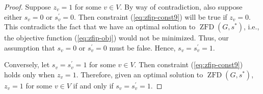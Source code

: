 \documentclass{article}
\newcommand\dzf[1]{\operatorname{ZFD}\left(#1\right)}
\theoremstyle{definition}
\begin{document}
\begin{proof}
Suppose $z_v = 1$ for some $v \in V$.
By way of contradiction, also suppose either $s_v = 0$ or $s_v^{'} = 0$.
Then constraint  (\ref{eq:zfip-const9}) will be true if $z_v = 0$.
This contradicts the fact that we have an optimal solution to $\dzf{G,s^{*}}$, i.e., the objective function (\ref{eq:zfip-obj}) would not be minimized.
Thus, our assumption that $s_v = 0$ or $s_v^{'} = 0$ must be false.
Hence, $s_v = s_v^{'} = 1$.

Conversely, let $s_v = s_v^{'} = 1$ for some $v \in V$.
Then constraint (\ref{eq:zfip-const9}) holds only when $z_v = 1$. 
Therefore, given an optimal solution to $\dzf{G,s^{*}}$, $z_v = 1$ for some $v \in V$ if and only if $s_v = s_v^{'} = 1$.
\end{proof}
\end{document}
